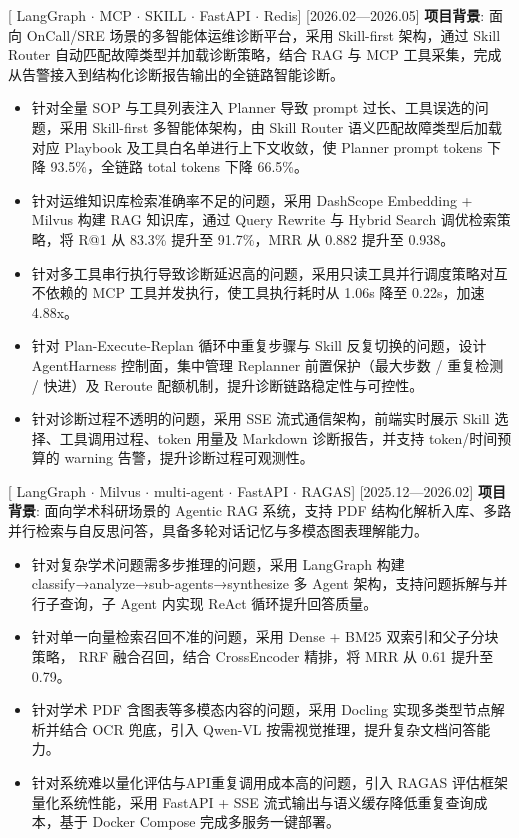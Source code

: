 \documentclass{resume-photo}
\begin{document}
[\textnormal{ LangGraph $\cdot$ MCP $\cdot$ SKILL $\cdot$ FastAPI $\cdot$ Redis}]
[2026.02—2026.05]
\vspace{0.3em}
\noindent \textbf{项目背景}: 面向 OnCall/SRE 场景的多智能体运维诊断平台，采用 Skill-first 架构，通过 Skill Router 自动匹配故障类型并加载诊断策略，结合 RAG 与 MCP 工具采集，完成从告警接入到结构化诊断报告输出的全链路智能诊断。
\begin{itemize}
  \item 针对全量 SOP 与工具列表注入 Planner 导致 prompt 过长、工具误选的问题，采用 Skill-first 多智能体架构，由 Skill Router 语义匹配故障类型后加载对应 Playbook 及工具白名单进行上下文收敛，使 Planner prompt tokens 下降 93.5\%，全链路 total tokens 下降 66.5\%。
  \item 针对运维知识库检索准确率不足的问题，采用 DashScope Embedding + Milvus 构建 RAG 知识库，通过 Query Rewrite 与 Hybrid Search 调优检索策略，将 R@1 从 83.3\% 提升至 91.7\%，MRR 从 0.882 提升至 0.938。
  \item 针对多工具串行执行导致诊断延迟高的问题，采用只读工具并行调度策略对互不依赖的 MCP 工具并发执行，使工具执行耗时从 1.06s 降至 0.22s，加速 4.88x。
  \item 针对 Plan-Execute-Replan 循环中重复步骤与 Skill 反复切换的问题，设计 AgentHarness 控制面，集中管理 Replanner 前置保护（最大步数 / 重复检测 / 快进）及 Reroute 配额机制，提升诊断链路稳定性与可控性。
  \item 针对诊断过程不透明的问题，采用 SSE 流式通信架构，前端实时展示 Skill 选择、工具调用过程、token 用量及 Markdown 诊断报告，并支持 token/时间预算的 warning 告警，提升诊断过程可观测性。
\end{itemize}

\vspace{0.3em}

[\textnormal{ LangGraph $\cdot$ Milvus $\cdot$ multi-agent $\cdot$ FastAPI $\cdot$ RAGAS}]
[2025.12—2026.02]
\vspace{0.3em}
\noindent \textbf{项目背景}: 面向学术科研场景的 Agentic RAG 系统，支持 PDF 结构化解析入库、多路并行检索与自反思问答，具备多轮对话记忆与多模态图表理解能力。
\begin{itemize}
  \item 针对复杂学术问题需多步推理的问题，采用 LangGraph 构建 classify→analyze→sub-agents→synthesize 多 Agent 架构，支持问题拆解与并行子查询，子 Agent 内实现 ReAct 循环提升回答质量。
  \item 针对单一向量检索召回不准的问题，采用 Dense + BM25 双索引和父子分块策略， RRF 融合召回，结合 CrossEncoder 精排，将 MRR 从 0.61 提升至 0.79。
  \item 针对学术 PDF 含图表等多模态内容的问题，采用 Docling 实现多类型节点解析并结合 OCR 兜底，引入 Qwen-VL 按需视觉推理，提升复杂文档问答能力。
  \item 针对系统难以量化评估与API重复调用成本高的问题，引入 RAGAS 评估框架量化系统性能，采用 FastAPI + SSE 流式输出与语义缓存降低重复查询成本，基于 Docker Compose 完成多服务一键部署。
\end{itemize}
\end{document}
